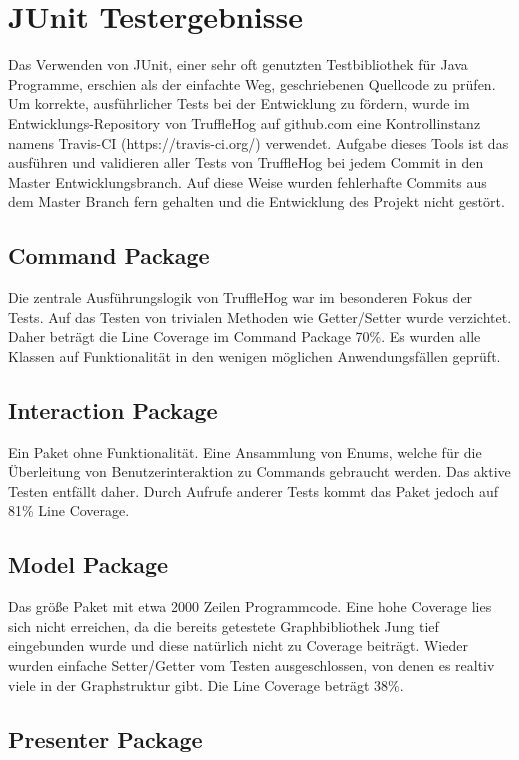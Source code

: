 \chapter{JUnit Testergebnisse}
Das Verwenden von JUnit, einer sehr oft genutzten Testbibliothek für Java Programme, erschien als der einfachte Weg, geschriebenen Quellcode zu prüfen. Um korrekte, ausführlicher Tests bei der Entwicklung zu fördern, wurde im Entwicklungs-Repository von TruffleHog auf github.com eine Kontrollinstanz namens Travis-CI (https://travis-ci.org/) verwendet. Aufgabe dieses Tools ist das ausführen und validieren aller Tests von TruffleHog bei jedem Commit in den Master Entwicklungsbranch. Auf diese Weise wurden fehlerhafte Commits aus dem Master Branch fern gehalten und die Entwicklung des Projekt nicht gestört.

\section{Command Package}

Die zentrale Ausführungslogik von TruffleHog war im besonderen Fokus der Tests. Auf das Testen von trivialen Methoden wie Getter/Setter wurde verzichtet. Daher beträgt die Line Coverage im Command Package  70\%. Es wurden alle Klassen auf Funktionalität in den wenigen möglichen Anwendungsfällen geprüft.

\section{Interaction Package}
Ein Paket ohne Funktionalität. Eine Ansammlung von Enums, welche für die Überleitung von Benutzerinteraktion zu Commands gebraucht werden. Das aktive Testen entfällt daher. Durch Aufrufe anderer Tests kommt das Paket jedoch auf 81\% Line Coverage.

\section{Model Package}
Das größe Paket mit etwa 2000 Zeilen Programmcode. Eine hohe Coverage lies sich nicht erreichen, da die bereits getestete Graphbibliothek Jung tief eingebunden wurde und diese natürlich nicht zu Coverage beiträgt. Wieder wurden einfache Setter/Getter vom Testen ausgeschlossen, von denen es realtiv viele in der Graphstruktur gibt. Die Line Coverage beträgt 38\%.

\section{Presenter Package}

